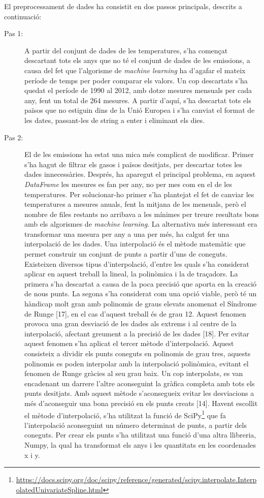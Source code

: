 \documentclass[10pt,a4paper,twocolumn,twoside]{article}
\begin{document}
El preprocessament de dades ha consistit en dos passos principals, descrits a continuació:
\begin{description}
\item[Pas 1:] A partir del conjunt de dades de les temperatures, s'ha començat descartant tots els anys que no té el conjunt de dades de les emissions, a causa del fet que l'algorisme de  \textit{machine learning} ha d'agafar el mateix període de temps per poder comparar els valors. Un cop descartats s'ha quedat el període de 1990 al 2012, amb dotze mesures mensuals per cada any, fent un total de 264 mesures. A partir d'aquí, s'ha descartat tots els països que no estiguin dins de la Unió Europea i s'ha canviat el format de les dates, passant-les de string a enter i eliminant els dies.
\item[Pas 2:]  El de les emissions ha estat una mica més complicat de modificar. Primer s'ha hagut de filtrar els gasos i països desitjats, per descartar totes les dades innecessàries. Després, ha aparegut el principal problema, en aquest \textit{DataFrame} les mesures es fan per any, no per mes com en el de les temperatures. Per solucionar-ho primer s'ha plantejat el fet de canviar les temperatures a mesures anuals, fent la mitjana de les mensuals, però el nombre de files restants no arribava a les mínimes per treure resultats bons amb els algorismes de \textit{machine learning}. La alternativa més interessant era transformar una mesura per any a una per més, ha calgut fer una interpolació de les dades.
Una interpolació és el mètode matemàtic que permet construir un conjunt de punts a partir d'uns de coneguts. Existeixen diversos tipus d'interpolació, d'entre les quals s'ha considerat aplicar en aquest treball la lineal, la polinòmica i la de traçadors. La primera s'ha descartat a causa de la poca precisió que aporta en la creació de nous punts. La segona s'ha considerat com una opció viable, però té un hàndicap molt gran amb polinomis de graus elevats anomenat el Síndrome de Runge [17], en el cas d'aquest treball és de grau 12. Aquest fenomen provoca una gran desviació de les dades als extrems i al centre de la interpolació, afectant greument a la precisió de les dades [18]. Per evitar aquest fenomen s'ha aplicat el tercer mètode d'interpolació. Aquest consisteix a dividir els punts coneguts en polinomis de grau tres, aquests polinomis es poden interpolar amb la interpolació polinòmica, evitant el fenomen de Runge gràcies al seu grau baix. Un cop interpolats, es van encadenant un darrere l'altre aconseguint la gràfica completa amb tots els punts desitjats. Amb aquest mètode s'aconsegueix evitar les desviacions a més d'aconseguir una bona precisió en els punts creats [14]. Havent escollit el mètode d'interpolació, s'ha utilitzat la funció de SciPy\footnote{\url{https://docs.scipy.org/doc/scipy/reference/generated/scipy.interpolate.InterpolatedUnivariateSpline.html}} que fa l'interpolació aconseguint un número determinat de punts, a partir dels coneguts. Per crear els punts s'ha utilitzat una funció d'una altra llibreria, Numpy, la qual ha transformat els anys i les quantitats en les coordenades x i y.
\end{description}
\end{document}
